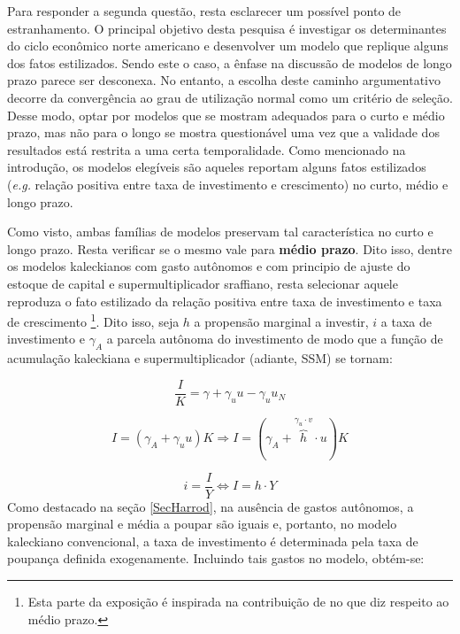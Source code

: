 Para responder a segunda questão, resta esclarecer um possível ponto de estranhamento. O principal objetivo desta pesquisa é investigar os determinantes do ciclo econômico norte americano e desenvolver um modelo que replique alguns dos fatos estilizados. Sendo este o caso, a ênfase na discussão de modelos de longo prazo parece ser desconexa. No entanto, a escolha deste caminho argumentativo decorre da convergência ao grau de utilização normal como um critério de seleção. Desse modo, optar por modelos que se mostram adequados para o curto e médio prazo, mas não para o longo se mostra questionável uma vez que a validade dos resultados está restrita a uma certa temporalidade. Como mencionado na introdução, os modelos elegíveis são aqueles reportam alguns fatos estilizados (\textit{e.g.} relação positiva entre taxa de investimento e crescimento)  no curto, médio e longo prazo.

Como visto, ambas famílias de modelos preservam tal característica no curto e longo prazo. Resta verificar se o mesmo vale para \textbf{médio prazo}. Dito isso, dentre os modelos kaleckianos com gasto autônomos e com principio de ajuste do estoque de capital e supermultiplicador sraffiano, resta selecionar aquele reproduza o fato estilizado da relação positiva entre taxa de investimento e taxa de crescimento \cites[p.~172]{cesaratto_neo-kaleckian_2015}[p.~8--9]{fiebiger_trend_2017}\footnote{Esta parte da exposição é inspirada na contribuição de \textcite{fagundes_role_2017} no que diz respeito ao médio prazo.}. Dito isso, seja $h$ a propensão marginal a investir, $i$ a taxa de investimento e $\gamma_A$ a parcela autônoma do investimento de modo que a função de acumulação kaleckiana e supermultiplicador (adiante, SSM) se tornam:

$$
\frac{I}{K}  = \gamma + \gamma_uu - \gamma_uu_N
$$


\begin{equation}
    \tag{kaleckiana}
I = (\gamma_A + \gamma_uu)K \Rightarrow I = (\gamma_A + \overbrace{h}^{\gamma_u\cdot v}\cdot u)K
\end{equation}

\begin{equation}
    \tag{SSM}
    i = \frac{I}{Y} \Leftrightarrow I = h\cdot Y
\end{equation}
Como destacado na seção \ref{SecHarrod}, na ausência de gastos autônomos, a propensão marginal e média a poupar são iguais e, portanto, no modelo kaleckiano convencional, a taxa de investimento é determinada pela taxa de poupança definida exogenamente. Incluindo tais gastos no modelo, obtém-se:

